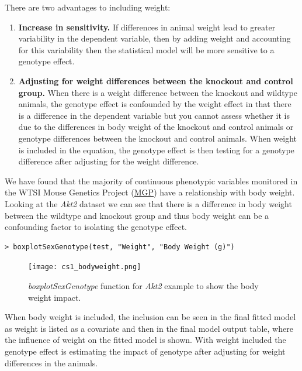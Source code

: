 \documentclass[12pt,a4paper]{article}
\begin{document}
There are two advantages to including weight:
\begin{enumerate}
 \item \textbf{Increase in sensitivity.}  
If differences in animal weight lead to greater variability in the dependent variable, then by adding weight and accounting for this variability then the statistical model will be more sensitive to a genotype effect. 

 \item \textbf{Adjusting for weight differences between the knockout and control group.}  
When there is a weight difference between the knockout and wildtype animals, the genotype effect is confounded by the weight effect in that there is a difference in the dependent variable but you cannot assess whether it is due to the differences in body weight of the knockout and control animals or genotype differences between the knockout and control animals. When weight is included in the equation, the genotype effect is then testing for a genotype difference after adjusting for the weight difference.

\end{enumerate}

We have found that the majority of continuous phenotypic variables monitored in the WTSI Mouse Genetics Project (\href{http://www.sanger.ac.uk/resources/mouse/}{MGP}) have a relationship with body weight. 
Looking at the \textit{Akt2} dataset we can see that there is a difference in body weight between the wildtype and knockout group and thus body weight can be a confounding factor to isolating the genotype effect.   

\begingroup
    \fontsize{8pt}{12pt}\selectfont
\begin{verbatim}
> boxplotSexGenotype(test, "Weight", "Body Weight (g)")
\end{verbatim}
\endgroup 

\begin{figure}[H]%
\centerline{\texttt{[image: cs1\_bodyweight.png]}}
\caption{\textit{boxplotSexGenotype} function for \textit{Akt2} example to show the body weight impact.}\label{fig:22}
\end{figure}

When body weight is included, the inclusion can be seen in the final fitted model as weight is listed as a covariate and then in the final model output table, where the influence of weight on the fitted model is shown.  
With weight included the genotype effect is estimating the impact of genotype after adjusting for weight differences in the animals. 
\end{document}
